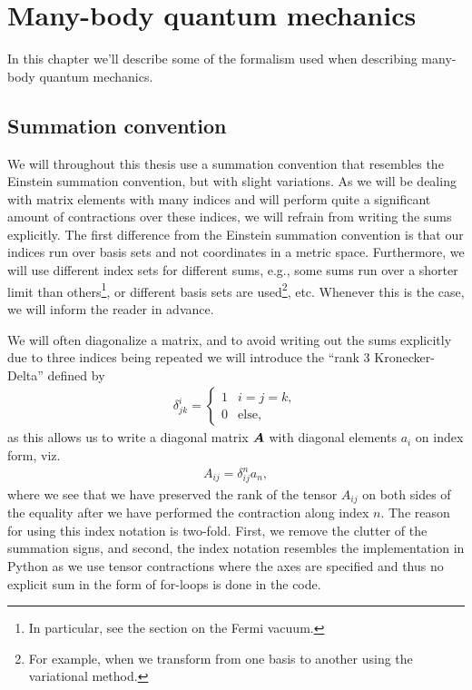 \chapter{Many-body quantum mechanics}
    In this chapter we'll describe some of the formalism used when describing
    many-body quantum mechanics.

    \section{Summation convention}
        We will throughout this thesis use a summation convention that
        resembles the Einstein summation convention, but with slight
        variations.
        As we will be dealing with matrix elements with many indices and will
        perform quite a significant amount of contractions over these indices,
        we will refrain from writing the sums explicitly.
        The first difference from the Einstein summation convention is that our
        indices run over basis sets and not coordinates in a metric space.
        Furthermore, we will use different index sets for different sums, e.g.,
        some sums run over a shorter limit than others\footnote{%
            In particular, see the section on the Fermi vacuum.%
        }, or different basis sets are used\footnote{%
            For example, when we transform from one basis to another using the
            variational method.%
        }, etc.
        Whenever this is the case, we will inform the reader in advance.

        We will often diagonalize a matrix, and to avoid writing out the sums
        explicitly due to three indices being repeated we will introduce the
        ``rank 3 Kronecker-Delta'' defined by
        \begin{align}
            \delta^{i}_{jk} = \begin{cases}
                1 & i = j = k, \\
                0 & \text{else},
            \end{cases}
            \label{eq:rank-3-kd}
        \end{align}
        as this allows us to write a diagonal matrix $\boldsymbol{A}$ with diagonal
        elements $a_i$ on index form, viz.
        \begin{align}
            A_{ij} = \delta^{n}_{ij} a_{n},
        \end{align}
        where we see that we have preserved the rank of the tensor $A_{ij}$ on
        both sides of the equality after we have performed the contraction along
        index $n$.
        The reason for using this index notation is two-fold. First, we remove
        the clutter of the summation signs, and second, the index notation
        resembles the implementation in Python as we use tensor contractions
        where the axes are specified and thus no explicit sum in the form of
        for-loops is done in the code.

